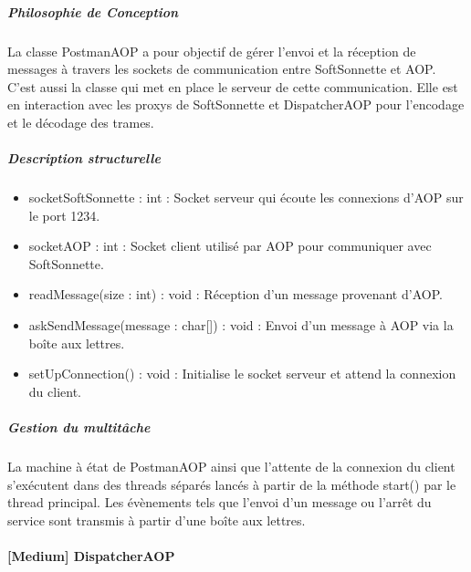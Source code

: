         \subparagraph{Philosophie de Conception}%
                
            La classe PostmanAOP a pour objectif de gérer l'envoi et la réception de messages à travers les sockets de communication entre SoftSonnette et AOP.
            C'est aussi la classe qui met en place le serveur de cette communication.
            Elle est en interaction avec les proxys de SoftSonnette et DispatcherAOP pour l'encodage et le décodage des trames.

            \subparagraph{Description structurelle}%
                

            \begin{itemize}
                \item {socketSoftSonnette : int : Socket serveur qui écoute les connexions d'AOP sur le port 1234.} 
                \item {socketAOP : int : Socket client utilisé par AOP pour communiquer avec SoftSonnette.}    
            \end{itemize}  
            

            \begin{itemize}
                \item {readMessage(size : int) : void : Réception d'un message provenant d'AOP.}
                \item {askSendMessage(message : char[]) : void : Envoi d'un message à AOP via la boîte aux lettres.} 
                \item {setUpConnection() : void : Initialise le socket serveur et attend la connexion du client.}
            \end{itemize}  

            \subparagraph{Gestion du multitâche}%

            La machine à état de PostmanAOP ainsi que l'attente de la connexion du client s’exécutent dans des threads séparés lancés à partir de la méthode start() par le thread principal.
            Les évènements tels que l'envoi d'un message ou l'arrêt du service sont transmis à partir d'une boîte aux lettres. 
            \newpage

    \paragraph{[Medium] DispatcherAOP}

